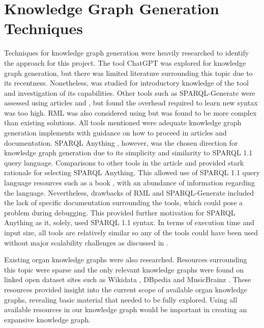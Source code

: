 \section{Knowledge Graph Generation Techniques}
\hspace{0.5cm} Techniques for knowledge graph generation were heavily researched to identify the approach for this project. The tool ChatGPT \cite{chatgptwebsite} was explored for knowledge graph generation, but there was limited literature surrounding this topic due to its recentness. Nonetheless, \cite{chatgpt} was studied for introductory knowledge of the tool and investigation of its capabilities. Other tools such as SPARQL-Generate \cite{sparqlgenerate} were assessed using articles \cite{lefranccois2017flexible} and \cite{lefranccois2017sparql}, but found the overhead required to learn new syntax was too high. RML \cite{rml} was also considered using \cite{dimou2014rml} but was found to be more complex than existing solutions. All tools mentioned were adequate knowledge graph generation implements with guidance on how to proceed in articles and documentation. SPARQL Anything \cite{sparqlanythinggithub}, however, was the chosen direction for knowledge graph generation due to its simplicity and similarity to SPARQL 1.1 query language. Comparisons to other tools in the article \cite{sparqlanything} and \cite{asprino2023knowledge} provided stark rationale for selecting SPARQL Anything. This allowed use of SPARQL 1.1 query language resources such as a book \cite{sparlbook}, with an abundance of information regarding the language. Nevertheless, drawbacks of RML and SPARQL-Generate included the lack of specific documentation surrounding the tools, which could pose a problem during debugging. This provided further motivation for SPARQL Anything as it, solely, used SPARQL 1.1 syntax. In terms of execution time and input size, all tools are relatively similar so any of the tools could have been used without major scalability challenges as discussed in \cite{sparqlanything}. 

Existing organ knowledge graphs were also researched. Resources surrounding this topic were sparse and the only relevant knowledge graphs were found on linked open dataset sites such as Wikidata \cite{organwikidata}, DBpedia \cite{organdbpedia} and MusicBrainz \cite{organmusicbrainz}. These resources provided insight into the current scope of available organ knowledge graphs, revealing basic material that needed to be fully explored. Using all available resources in our knowledge graph would be important in creating an expansive knowledge graph.

